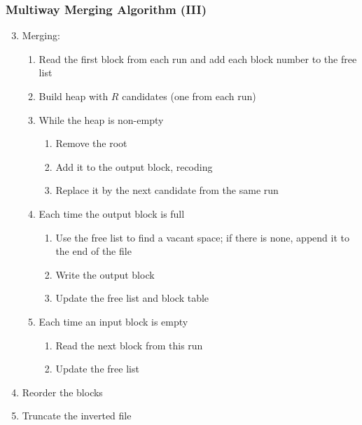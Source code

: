 \documentclass[svgnames]{beamer}
\begin{document}
\begin{frame}
    \frametitle{Multiway Merging Algorithm (III)}
    
    \begin{enumerate}
        \setcounter{enumi}{2}
    \item Merging:
        \begin{enumerate}
        \item Read the first block from each run and add each block number to
            the free list
        \item Build heap with $R$ candidates (one from each run)
        \item While the heap is non-empty
            \begin{enumerate}
            \item Remove the root
            \item Add it to the output block, recoding
            \item Replace it by the next candidate from the same run
            \end{enumerate}
        \item Each time the output block is full
            \begin{enumerate}
            \item Use the free list to find a vacant space; if there is none, append
                it to the end of the file
            \item Write the output block
            \item Update the free list and block table
            \end{enumerate}
        \item Each time an input block is empty
            \begin{enumerate}
            \item Read the next block from this run
            \item Update the free list
            \end{enumerate}
        \end{enumerate}
    \item Reorder the blocks
    \item Truncate the inverted file
    \end{enumerate}
\end{frame}

\end{document}
